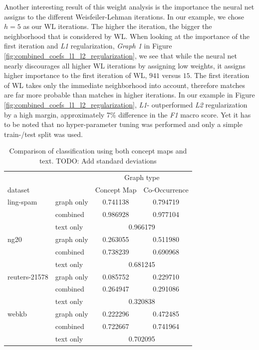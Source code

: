 Another interesting result of this weight analysis is the importance the neural net assigns to the different Weisfeiler-Lehman iterations. In our example, we chose $h = 5$ as our WL iterations. The higher the iteration, the bigger the neighborhood that is considered by WL.
When looking at the importance of the first iteration and \textit{L1} regularization, \textit{Graph 1} in Figure \ref{fig:combined_coefs_l1_l2_regularization}, we see that while the neural net nearly discourages all higher WL iterations by assigning low weights, it assigns higher importance to the first iteration of WL, $941$ versus $15$.
The first iteration of WL takes only the immediate neighborhood into account, therefore matches are far more probable than matches in higher iterations.
In our example in Figure \ref{fig:combined_coefs_l1_l2_regularization}, \textit{L1}- outperformed \textit{L2} regularization by a high margin, approximately 7\% difference in the \textit{F1} macro score.
Yet it has to be noted that no hyper-parameter tuning was performed and only a simple train-/test split was used.



\begin{table}[htb!]
\centering
\begin{tabular}{llcc}
  &  & \multicolumn{2}{c}{Graph type} \\
   dataset   & &  Concept Map &  Co-Occurrence \\
\midrule
ling-spam 
          & graph only &  0.741138 &  0.794719\\
          & combined &  0.986928 &  0.977104\\
          & text only & \multicolumn{2}{c}{ 0.966179 }\\
\midrule
ng20 
          & graph only &  0.263055 &  0.511980\\
          & combined &  0.738239 &  0.690968\\
          & text only & \multicolumn{2}{c}{ 0.681245 }\\
\midrule
reuters-21578 
          & graph only &  0.085752 &  0.229710\\
          & combined &  0.264947 &  0.291086\\
          & text only & \multicolumn{2}{c}{ 0.320838 }\\
\midrule
webkb 
          & graph only &  0.222296 &  0.472485\\
          & combined &  0.722667 &  0.741964\\
          & text only & \multicolumn{2}{c}{ 0.702095 }\\	
\bottomrule
\end{tabular}
\caption[Results: Combined text- and graph features]{Comparison of classification using both concept maps and text. TODO: Add standard deviations}%
\label{table:results_comparison_combined}
\end{table}

